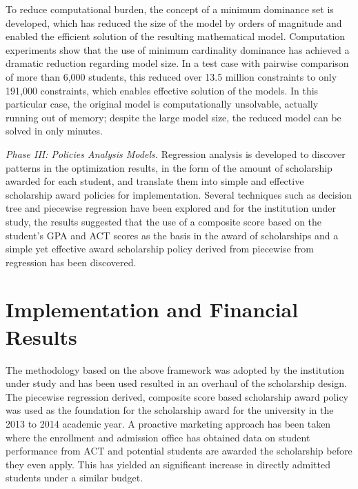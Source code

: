 \documentclass[12pt,english]{report}
\begin{document}
To reduce computational burden, the concept of a minimum dominance set is developed, which has reduced the size of the model by orders of magnitude and enabled the efficient solution of the resulting mathematical model. Computation experiments show that the use of minimum cardinality dominance has achieved a dramatic reduction regarding model size. In a test case with pairwise comparison of more than 6,000 students, this reduced over 13.5 million constraints to only 191,000 constraints, which enables effective solution of the models.   In this particular case,  the original model is computationally unsolvable, actually running out of memory; despite the large model size, the reduced model can be solved in only minutes.

\noindent \textit{Phase III: Policies Analysis Models.} Regression analysis is developed to discover patterns in the optimization results, in the form of the amount of scholarship awarded for each student, and translate them into simple and effective scholarship award policies for implementation. Several techniques such as decision tree and piecewise regression  have been explored  and for the institution under study, the results suggested that the use of a composite score based on the student's GPA and ACT scores as the basis in the award of scholarships and a simple  yet effective award scholarship policy derived from piecewise from regression has been discovered.

\section{Implementation and Financial Results}

The methodology based on the above framework was adopted by the institution under study and has been used resulted in an overhaul of the scholarship design. The piecewise regression derived, composite score based scholarship award policy was used as the foundation for the scholarship award for the university in the 2013 to 2014 academic year. A proactive marketing approach has been taken where the enrollment and admission office has obtained data on student performance from ACT and potential students are awarded the scholarship before they even apply. This has yielded an significant increase in directly admitted students under a similar budget. 
\end{document}
